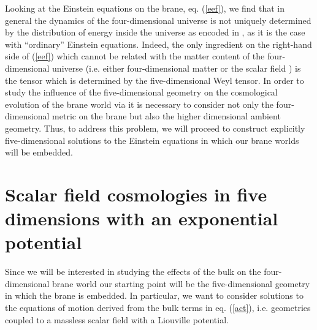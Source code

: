 \documentclass[prd,a4paper,twocolumn,superscriptaddress,nofootinbib,showpacs]{revtex4}
\begin{document}
Looking at the Einstein equations on the brane, eq. (\ref{eef}), we find that in general the dynamics of the
four-dimensional universe is not uniquely determined by the distribution of energy inside the 
universe as encoded in \myHighlight{$\tau_{\mu\nu}$}\coordHE{} \cite{mss,mw}, as it is the case with ``ordinary'' Einstein equations. 
Indeed, the only ingredient on the right-hand side of (\ref{eef}) which cannot be related with the matter content of the 
four-dimensional universe (i.e. either four-dimensional matter or the scalar field \myHighlight{$\phi$}\coordHE{}) is the tensor \coordHE{}
which is determined by the five-dimensional Weyl tensor. In order to study the influence of the five-dimensional
geometry on the cosmological evolution of the brane world via 
\coordHE{} it is necessary to consider not only 
the four-dimensional metric on the brane but also the higher dimensional ambient geometry. Thus, 
to address this problem, we will proceed to construct explicitly five-dimensional solutions to the Einstein equations 
in which our brane worlds will be embedded.

\section{Scalar field cosmologies in five dimensions with an exponential potential}

Since we will be interested in studying the effects of the bulk on 
the four-dimensional brane world our starting point will be the five-dimensional 
geometry in which the brane is  embedded. In particular, we want to 
consider solutions to the equations of motion derived from the bulk terms in eq. (\ref{act}), i.e. geometries
coupled to a massless scalar field with a Liouville potential.
\end{document}
